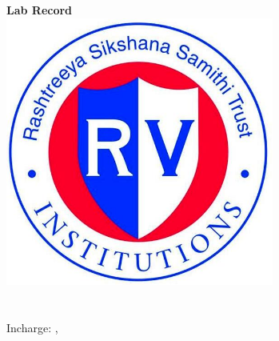 

\centering
\textbf{\Huge Lab Record}
\\[1in]


\includegraphics[height=250pt]{static/rvlogo.jpg}
\\[1in]

{\huge
     \\~\\
    Incharge:  , } \\~\\

